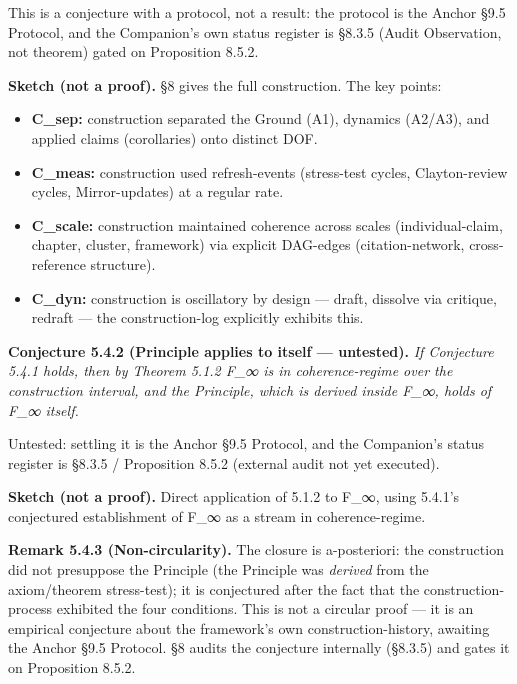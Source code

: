 \documentclass[11pt, openany]{book}
\begin{document}
This is a conjecture with a protocol, not a result: the protocol is the Anchor §9.5 Protocol, and the Companion's own status register is §8.3.5 (Audit Observation, not theorem) gated on Proposition 8.5.2.

\textbf{Sketch (not a proof).} §8 gives the full construction. The key points:

\begin{itemize}
\item \textbf{C\_\allowbreak{}sep:} construction separated the Ground (A1), dynamics (A2/A3), and applied claims (corollaries) onto distinct DOF.
\item \textbf{C\_\allowbreak{}meas:} construction used refresh-events (stress-test cycles, Clayton-review cycles, Mirror-updates) at a regular rate.
\item \textbf{C\_\allowbreak{}scale:} construction maintained coherence across scales (individual-claim, chapter, cluster, framework) via explicit DAG-edges (citation-network, cross-reference structure).
\item \textbf{C\_\allowbreak{}dyn:} construction is oscillatory by design --- draft, dissolve via critique, redraft --- the construction-log explicitly exhibits this.
\end{itemize}

\textbf{Conjecture 5.4.2 (Principle applies to itself --- untested).} \textit{If Conjecture 5.4.1 holds, then by Theorem 5.1.2 F\_\allowbreak{}∞ is in coherence-regime over the construction interval, and the Principle, which is derived inside F\_\allowbreak{}∞, holds of F\_\allowbreak{}∞ itself.}

Untested: settling it is the Anchor §9.5 Protocol, and the Companion's status register is §8.3.5 / Proposition 8.5.2 (external audit not yet executed).

\textbf{Sketch (not a proof).} Direct application of 5.1.2 to F\_\allowbreak{}∞, using 5.4.1's conjectured establishment of F\_\allowbreak{}∞ as a stream in coherence-regime.

\textbf{Remark 5.4.3 (Non-circularity).} The closure is a-posteriori: the construction did not presuppose the Principle (the Principle was \textit{derived} from the axiom/theorem stress-test); it is conjectured after the fact that the construction-process exhibited the four conditions. This is not a circular proof --- it is an empirical conjecture about the framework's own construction-history, awaiting the Anchor §9.5 Protocol. §8 audits the conjecture internally (§8.3.5) and gates it on Proposition 8.5.2.
\end{document}
